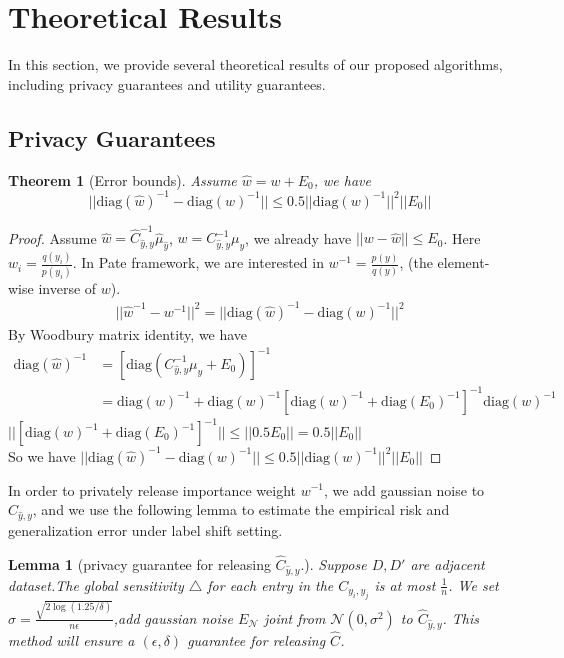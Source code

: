 \documentclass{article}
\def\diag{\mathrm{diag}}
\def\cN{\mathcal{N}}
\newtheorem{lemma}{Lemma}
\newtheorem{theorem}{Theorem}
\theoremstyle{definition}
\begin{document}
\section{Theoretical Results}
In this section, we provide several theoretical results of our proposed algorithms, including privacy guarantees and utility guarantees.

\subsection{Privacy Guarantees}
\begin{theorem}[Error bounds]
	Assume $\hat{w} = w + E_0$, we have 
	$$
	||	\diag(\hat{w})^{-1} -  \diag(w)^{-1}|| \leq 0.5|| \diag(w)^{-1}||^2 ||E_0||
	$$
\end{theorem}
\begin{proof}
	Assume $\hat w  = \hat C_{\hat y, y}^{-1}\hat{\mu}_{\hat y} $, $w = C_{\hat y, y}^{-1} \mu_{y}$, we already have $||w - \hat w|| \leq E_0$. Here $w_i = \frac{q(y_i)}{p(y_i)}$. In Pate framework, we are interested in $ w^{-1} = \frac{p(y)}{q(y)}$, (the element-wise inverse of $w$).
	\begin{align}
	  || \hat w^{-1} -w^{-1}||^2 = || {\diag (\hat w)}^{-1} - {\diag( w)}^{-1}||^2
	\end{align}
By Woodbury matrix identity, we have 
\begin{align}
	\diag(\hat{w})^{-1} &= [\diag(C_{\hat y, y}^{-1}\mu_{y} + E_0)]^{-1} \\
	&= \diag(w)^{-1} + \diag(w)^{-1}[\diag(w)^{-1} + \diag(E_0)^{-1}]^{-1}\diag(w)^{-1}
\end{align}
$||[\diag(w)^{-1} + \diag(E_0)^{-1}]^{-1}|| \leq||0.5E_0|| =0.5||E_0||$\\
So we have $||	\diag(\hat{w})^{-1} -  \diag(w)^{-1}|| \leq 0.5|| \diag(w)^{-1}||^2 ||E_0||$
\end{proof}
In order to privately release importance weight $w^{-1}$, we add gaussian noise to $\hat{C}_{\hat y, y}$, and we use the following lemma to estimate the empirical risk and generalization error under label shift setting.
\begin{lemma}[privacy guarantee for releasing $\hat C_{\hat y, y}$.]
	Suppose $D,D'$ are adjacent dataset.The global sensitivity $\triangle$ for each entry in the $C_{y_i, y_j}$ is at most $\frac{1}{n}$. We set $\sigma = \frac{\sqrt{2 \log(1.25/\delta)}}{n \epsilon}$,add gaussian noise $E_{\cN} $ joint from $\cN(0, \sigma^2)$ to
	$\hat C_{\hat y, y}$.  This method will ensure a $(\epsilon, \delta)$ guarantee for releasing $\hat C$.
\end{lemma}\label{privacy_label}
\end{document}
